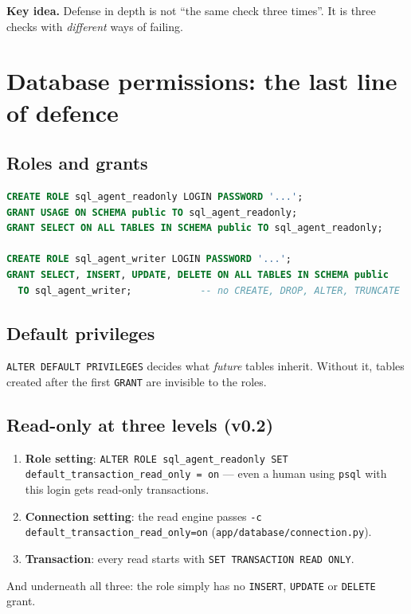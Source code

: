 \documentclass[11pt,a4paper]{article}
\newcommand{\keyidea}[1]{%
  \par\smallskip\noindent\colorbox{notebg}{\parbox{\dimexpr\linewidth-2\fboxsep}{\small\textbf{Key idea.} #1}}\par\smallskip}
\begin{document}
\keyidea{Defense in depth is not ``the same check three times''. It is three
checks with \emph{different} ways of failing.}

\section{Database permissions: the last line of defence}

\subsection*{Roles and grants}
\begin{lstlisting}[language=SQL]
CREATE ROLE sql_agent_readonly LOGIN PASSWORD '...';
GRANT USAGE ON SCHEMA public TO sql_agent_readonly;
GRANT SELECT ON ALL TABLES IN SCHEMA public TO sql_agent_readonly;

CREATE ROLE sql_agent_writer LOGIN PASSWORD '...';
GRANT SELECT, INSERT, UPDATE, DELETE ON ALL TABLES IN SCHEMA public
  TO sql_agent_writer;            -- no CREATE, DROP, ALTER, TRUNCATE
\end{lstlisting}

\subsection*{Default privileges}
\texttt{ALTER DEFAULT PRIVILEGES} decides what \emph{future} tables
inherit. Without it, tables created after the first \texttt{GRANT} are
invisible to the roles.

\subsection*{Read-only at three levels (v0.2)}
\begin{enumerate}[leftmargin=*]
  \item \textbf{Role setting}: \texttt{ALTER ROLE sql\_agent\_readonly SET
        default\_transaction\_read\_only = on} --- even a human using
        \texttt{psql} with this login gets read-only transactions.
  \item \textbf{Connection setting}: the read engine passes
        \texttt{-c default\_transaction\_read\_only=on}
        (\texttt{app/database/connection.py}).
  \item \textbf{Transaction}: every read starts with
        \texttt{SET TRANSACTION READ ONLY}.
\end{enumerate}
And underneath all three: the role simply has no \texttt{INSERT},
\texttt{UPDATE} or \texttt{DELETE} grant.
\end{document}
